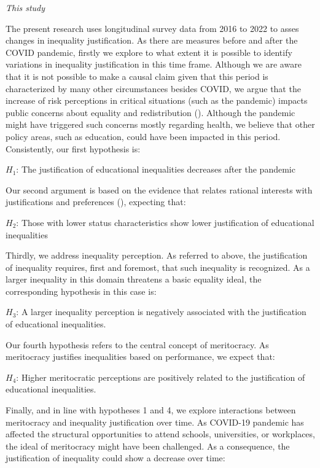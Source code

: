 \documentclass[
  12pt,
  a4paper,
]{article}
\begin{document}
\emph{This study}

The present research uses longitudinal survey data from 2016 to 2022 to asses changes in inequality justification. As there are measures before and after the COVID pandemic, firstly we explore to what extent it is possible to identify variations in inequality justification in this time frame. Although we are aware that it is not possible to make a causal claim given that this period is characterized by many other circumstances besides COVID, we argue that the increase of risk perceptions in critical situations (such as the pandemic) impacts public concerns about equality and redistribution (). Although the pandemic might have triggered such concerns mostly regarding health, we believe that other policy areas, such as education, could have been impacted in this period. Consistently, our first hypothesis is:

\(H_1\): The justification of educational inequalities decreases after the pandemic

Our second argument is based on the evidence that relates rational interests with justifications and preferences (), expecting that:

\(H_2\): Those with lower status characteristics show lower justification of educational inequalities

Thirdly, we address inequality perception. As referred to above, the justification of inequality requires, first and foremost, that such inequality is recognized. As a larger inequality in this domain threatens a basic equality ideal, the corresponding hypothesis in this case is:

\(H_3\): A larger inequality perception is negatively associated with the justification of educational inequalities.

Our fourth hypothesis refers to the central concept of meritocracy. As meritocracy justifies inequalities based on performance, we expect that:

\(H_4\): Higher meritocratic perceptions are positively related to the justification of educational inequalities.

Finally, and in line with hypotheses 1 and 4, we explore interactions between meritocracy and inequality justification over time. As COVID-19 pandemic has affected the structural opportunities to attend schools, universities, or workplaces, the ideal of meritocracy might have been challenged. As a consequence, the justification of inequality could show a decrease over time:
\end{document}
